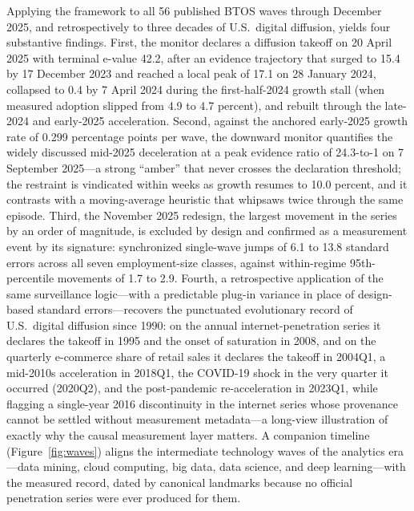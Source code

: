 \documentclass[review,authoryear,12pt]{elsarticle}
\begin{document}
Applying the framework to all 56 published BTOS waves through December 2025, and retrospectively to three decades of U.S.\ digital diffusion, yields four substantive findings. First, the monitor declares a diffusion takeoff on 20 April 2025 with terminal e-value 42.2, after an evidence trajectory that surged to 15.4 by 17 December 2023 and reached a local peak of 17.1 on 28 January 2024, collapsed to 0.4 by 7 April 2024 during the first-half-2024 growth stall (when measured adoption slipped from 4.9 to 4.7 percent), and rebuilt through the late-2024 and early-2025 acceleration. Second, against the anchored early-2025 growth rate of 0.299 percentage points per wave, the downward monitor quantifies the widely discussed mid-2025 deceleration at a peak evidence ratio of 24.3-to-1 on 7 September 2025---a strong ``amber'' that never crosses the declaration threshold; the restraint is vindicated within weeks as growth resumes to 10.0 percent, and it contrasts with a moving-average heuristic that whipsaws twice through the same episode. Third, the November 2025 redesign, the largest movement in the series by an order of magnitude, is excluded by design and confirmed as a measurement event by its signature: synchronized single-wave jumps of 6.1 to 13.8 standard errors across all seven employment-size classes, against within-regime 95th-percentile movements of 1.7 to 2.9. Fourth, a retrospective application of the same surveillance logic---with a predictable plug-in variance in place of design-based standard errors---recovers the punctuated evolutionary record of U.S.\ digital diffusion since 1990: on the annual internet-penetration series it declares the takeoff in 1995 and the onset of saturation in 2008, and on the quarterly e-commerce share of retail sales it declares the takeoff in 2004Q1, a mid-2010s acceleration in 2018Q1, the COVID-19 shock in the very quarter it occurred (2020Q2), and the post-pandemic re-acceleration in 2023Q1, while flagging a single-year 2016 discontinuity in the internet series whose provenance cannot be settled without measurement metadata---a long-view illustration of exactly why the causal measurement layer matters. A companion timeline (Figure~\ref{fig:waves}) aligns the intermediate technology waves of the analytics era---data mining, cloud computing, big data, data science, and deep learning---with the measured record, dated by canonical landmarks because no official penetration series were ever produced for them.
\end{document}
